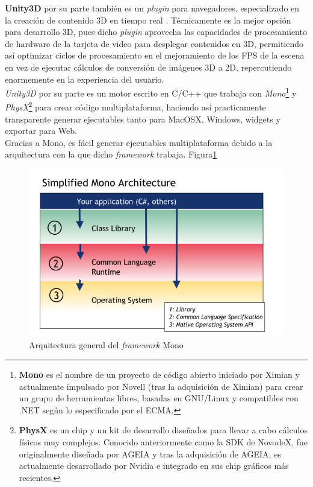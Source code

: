 \textbf{Unity3D} por su parte también es un \emph{plugin} para navegadores, especializado en la creación de contenido 3D en tiempo real \cite{vis:toolkitInteractiveInf}. Técnicamente es la mejor opción para desarrollo 3D, pues dicho \emph{plugin} aprovecha las capacidades de procesamiento de hardware de la tarjeta de video para desplegar contenidos en 3D, permitiendo así optimizar ciclos de procesamiento en el mejoramiento de los FPS de la escena en vez de ejecutar cálculos de conversión de imágenes 3D a 2D, repercutiendo enormemente en la experiencia del usuario.\\

\emph{Unity3D} por su parte es un motor escrito en C/C++ que trabaja con \emph{Mono}\footnote{\textbf{Mono} es el nombre de un proyecto de código abierto iniciado por Ximian y actualmente impulsado por Novell (tras la adquisición de Ximian) para crear un grupo de herramientas libres, basadas en GNU/Linux y compatibles con .NET según lo especificado por el ECMA.} y \emph{PhysX}\footnote{\textbf{PhysX} es un chip y un kit de desarrollo diseñados para llevar a cabo cálculos físicos muy complejos. Conocido anteriormente como la SDK de NovodeX, fue originalmente diseñada por AGEIA y tras la adquisición de AGEIA, es actualmente desarrollado por Nvidia e integrado en sus chip gráficos más recientes.} para crear código multiplataforma, haciendo así practicamente transparente generar ejecutables tanto para MacOSX, Windows, widgets y exportar para Web.\\

Gracias a Mono, es fácil generar ejecutables multiplataforma debido a la arquitectura con la que dicho \emph{framework} trabaja. Figura\ref{fig:mono}\\

\begin{figure}[h]
	\centering
		\includegraphics[scale=0.6]{Mono.PNG}
		\caption{Arquitectura general del \emph{framework} Mono}
	\label{fig:mono}
\end{figure}


